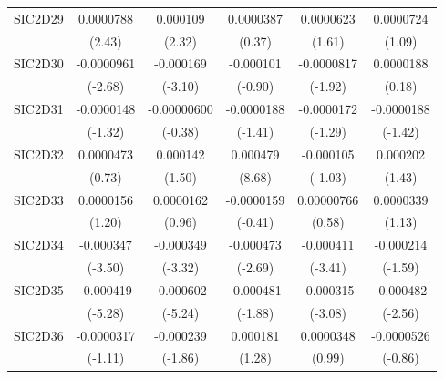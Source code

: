 \begin{table}[htbp]
\begin{tabular}{l*{5}{c}}
SIC2D29     &   0.0000788\sym{*}  &    0.000109\sym{*}  &   0.0000387         &   0.0000623         &   0.0000724         \\
            &      (2.43)         &      (2.32)         &      (0.37)         &      (1.61)         &      (1.09)         \\
SIC2D30     &  -0.0000961\sym{**} &   -0.000169\sym{**} &   -0.000101         &  -0.0000817         &   0.0000188         \\
            &     (-2.68)         &     (-3.10)         &     (-0.90)         &     (-1.92)         &      (0.18)         \\
SIC2D31     &  -0.0000148         & -0.00000600         &  -0.0000188         &  -0.0000172         &  -0.0000188         \\
            &     (-1.32)         &     (-0.38)         &     (-1.41)         &     (-1.29)         &     (-1.42)         \\
SIC2D32     &   0.0000473         &    0.000142         &    0.000479\sym{***}&   -0.000105         &    0.000202         \\
            &      (0.73)         &      (1.50)         &      (8.68)         &     (-1.03)         &      (1.43)         \\
SIC2D33     &   0.0000156         &   0.0000162         &  -0.0000159         &  0.00000766         &   0.0000339         \\
            &      (1.20)         &      (0.96)         &     (-0.41)         &      (0.58)         &      (1.13)         \\
SIC2D34     &   -0.000347\sym{***}&   -0.000349\sym{***}&   -0.000473\sym{**} &   -0.000411\sym{***}&   -0.000214         \\
            &     (-3.50)         &     (-3.32)         &     (-2.69)         &     (-3.41)         &     (-1.59)         \\
SIC2D35     &   -0.000419\sym{***}&   -0.000602\sym{***}&   -0.000481         &   -0.000315\sym{**} &   -0.000482\sym{*}  \\
            &     (-5.28)         &     (-5.24)         &     (-1.88)         &     (-3.08)         &     (-2.56)         \\
SIC2D36     &  -0.0000317         &   -0.000239         &    0.000181         &   0.0000348         &  -0.0000526         \\
            &     (-1.11)         &     (-1.86)         &      (1.28)         &      (0.99)         &     (-0.86)         \\

\end{tabular}
\end{table}
